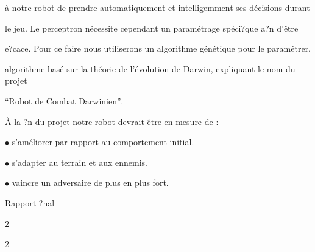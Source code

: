 \documentclass[a4paper,portrait,12pt]{article}
\begin{document}
\begin{flushleft}
\`{a} notre robot de prendre automatiquement et intelligemment ses d\'{e}cisions durant
\end{flushleft}


\begin{flushleft}
le jeu. Le perceptron n\'{e}cessite cependant un param\'{e}trage sp\'{e}ci?que a?n d'\^{e}tre
\end{flushleft}


\begin{flushleft}
e?cace. Pour ce faire nous utiliserons un algorithme g\'{e}n\'{e}tique pour le param\'{e}trer,
\end{flushleft}


\begin{flushleft}
algorithme bas\'{e} sur la th\'{e}orie de l'\'{e}volution de Darwin, expliquant le nom du projet
\end{flushleft}


\begin{flushleft}
{``}Robot de Combat Darwinien''.
\end{flushleft}


\begin{flushleft}
\`{A} la ?n du projet notre robot devrait \^{e}tre en mesure de :
\end{flushleft}


\begin{flushleft}
$\bullet$ s'am\'{e}liorer par rapport au comportement initial.
\end{flushleft}


\begin{flushleft}
$\bullet$ s'adapter au terrain et aux ennemis.
\end{flushleft}


\begin{flushleft}
$\bullet$ vaincre un adversaire de plus en plus fort.
\end{flushleft}





\begin{flushleft}
\newpage
Rapport ?nal
\end{flushleft}





2





2
\end{document}
